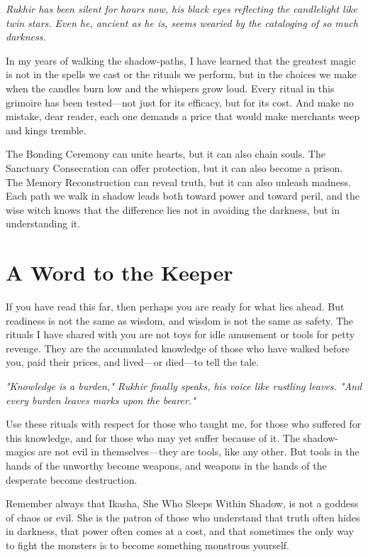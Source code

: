 \documentclass[12pt,twoside]{book}
\newcommand{\shadow}[1]{\textit{#1}}
\begin{document}
\shadow{Rukhir has been silent for hours now, his black eyes reflecting the candlelight like twin stars. Even he, ancient as he is, seems wearied by the cataloging of so much darkness.}

In my years of walking the shadow-paths, I have learned that the greatest magic is not in the spells we cast or the rituals we perform, but in the choices we make when the candles burn low and the whispers grow loud. Every ritual in this grimoire has been tested—not just for its efficacy, but for its cost. And make no mistake, dear reader, each one demands a price that would make merchants weep and kings tremble.

The Bonding Ceremony can unite hearts, but it can also chain souls. The Sanctuary Consecration can offer protection, but it can also become a prison. The Memory Reconstruction can reveal truth, but it can also unleash madness. Each path we walk in shadow leads both toward power and toward peril, and the wise witch knows that the difference lies not in avoiding the darkness, but in understanding it.

\section*{A Word to the Keeper}

If you have read this far, then perhaps you are ready for what lies ahead. But readiness is not the same as wisdom, and wisdom is not the same as safety. The rituals I have shared with you are not toys for idle amusement or tools for petty revenge. They are the accumulated knowledge of those who have walked before you, paid their prices, and lived—or died—to tell the tale.

\shadow{"Knowledge is a burden," Rukhir finally speaks, his voice like rustling leaves. "And every burden leaves marks upon the bearer."}

Use these rituals with respect for those who taught me, for those who suffered for this knowledge, and for those who may yet suffer because of it. The shadow-magics are not evil in themselves—they are tools, like any other. But tools in the hands of the unworthy become weapons, and weapons in the hands of the desperate become destruction.

Remember always that Ikasha, She Who Sleeps Within Shadow, is not a goddess of chaos or evil. She is the patron of those who understand that truth often hides in darkness, that power often comes at a cost, and that sometimes the only way to fight the monsters is to become something monstrous yourself.
\end{document}
